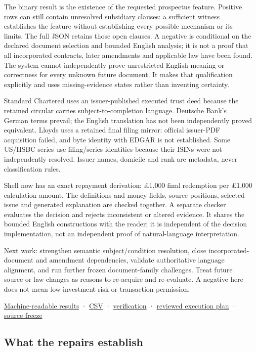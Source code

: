 \documentclass[
  11pt,
]{article}
\begin{document}
The binary result is the existence of the requested prospectus feature.
Positive rows can still contain unresolved subsidiary clauses: a
sufficient witness establishes the feature without establishing every
possible mechanism or its limits. The full JSON retains those open
clauses. A negative is conditional on the declared document selection
and bounded English analysis; it is not a proof that all incorporated
contracts, later amendments and applicable law have been found. The
system cannot independently prove unrestricted English meaning or
correctness for every unknown future document. It makes that
qualification explicitly and uses missing-evidence states rather than
inventing certainty.

Standard Chartered uses an issuer-published executed trust deed because
the retained circular carries subject-to-completion language. Deutsche
Bank's German terms prevail; the English translation has not been
independently proved equivalent. Lloyds uses a retained final filing
mirror: official issuer-PDF acquisition failed, and byte identity with
EDGAR is not established. Some US/HSBC series use filing/series
identities because their ISINs were not independently resolved. Issuer
names, domicile and rank are metadata, never classification rules.

Shell now has an exact repayment derivation: £1,000 final redemption per
£1,000 calculation amount. The definitions and money fields, source
positions, selected issue and generated explanation are checked
together. A separate checker evaluates the decision and rejects
inconsistent or altered evidence. It shares the bounded English
constructions with the reader; it is independent of the decision
implementation, not an independent proof of natural-language
interpretation.

Next work: strengthen semantic subject/condition resolution, close
incorporated-document and amendment dependencies, validate authoritative
language alignment, and run further frozen document-family challenges.
Treat future source or law changes as reasons to re-acquire and
re-evaluate. A negative here does not mean low investment risk or
transaction permission.

\href{results.json}{Machine-readable results} · \href{results.csv}{CSV}
· \href{execution/delivery-verification.json}{verification} ·
\href{../../../docs/plans/bond-two-case-repair.md}{reviewed execution
plan} · \href{execution/freeze-two-case-v3.json}{source freeze}

\hypertarget{what-the-repairs-establish}{%
\subsection{What the repairs
establish}\label{what-the-repairs-establish}}
\end{document}
